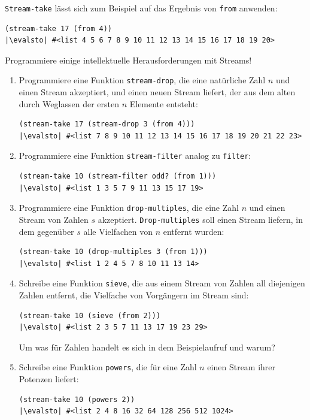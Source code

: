 \begin{aufgabe}
   \lstinline{Stream-take} lässt sich zum Beispiel auf das Ergebnis von
   \lstinline{from} anwenden:
\begin{lstlisting}
(stream-take 17 (from 4))
|\evalsto| #<list 4 5 6 7 8 9 10 11 12 13 14 15 16 17 18 19 20>
\end{lstlisting}
   Programmiere einige intellektuelle Herausforderungen mit Streams!
   \begin{enumerate}
   \item Programmiere eine Funktion \lstinline{stream-drop}, die eine
     natürliche Zahl $n$ und einen Stream akzeptiert, und einen neuen
     Stream liefert, der aus dem alten durch Weglassen der ersten $n$
     Elemente entsteht:
\begin{lstlisting}
(stream-take 17 (stream-drop 3 (from 4)))
|\evalsto| #<list 7 8 9 10 11 12 13 14 15 16 17 18 19 20 21 22 23>
\end{lstlisting}
   \item Programmiere eine Funktion \lstinline{stream-filter} analog zu
     \lstinline{filter}:
\begin{lstlisting}
(stream-take 10 (stream-filter odd? (from 1)))
|\evalsto| #<list 1 3 5 7 9 11 13 15 17 19>
\end{lstlisting}
   \item Programmiere eine Funktion \lstinline{drop-multiples}, die 
     eine Zahl $n$ und einen Stream von Zahlen $s$ akzeptiert.
     \lstinline{Drop-multiples} soll einen Stream liefern, in dem
     gegenüber $s$  alle Vielfachen von $n$ entfernt wurden:
\begin{lstlisting}
(stream-take 10 (drop-multiples 3 (from 1)))
|\evalsto| #<list 1 2 4 5 7 8 10 11 13 14>
\end{lstlisting}
   \item Schreibe eine Funktion \lstinline{sieve}, die aus einem Stream
     von Zahlen all diejenigen Zahlen entfernt, die Vielfache von
     Vorgängern im Stream sind:
\begin{lstlisting}
(stream-take 10 (sieve (from 2)))
|\evalsto| #<list 2 3 5 7 11 13 17 19 23 29>
\end{lstlisting}
     Um was für Zahlen handelt es sich in dem Beispielaufruf und
     warum?
   \item Schreibe eine Funktion \lstinline{powers}, die für eine Zahl
     $n$ einen Stream ihrer Potenzen liefert:
\begin{lstlisting}
(stream-take 10 (powers 2))
|\evalsto| #<list 2 4 8 16 32 64 128 256 512 1024>
\end{lstlisting}

\end{enumerate}
\end{aufgabe}
